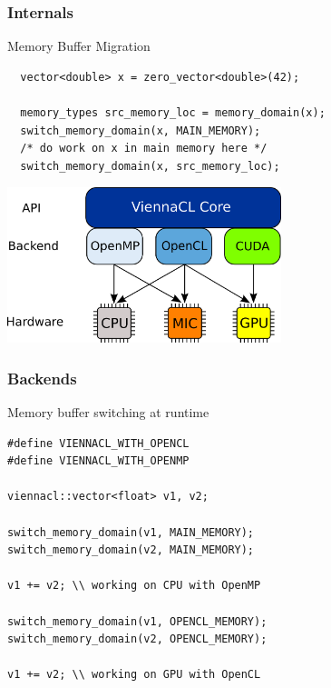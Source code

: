 \begin{frame}[fragile]
\frametitle{Internals}

 \begin{block}{Memory Buffer Migration}
  \begin{lstlisting}
  vector<double> x = zero_vector<double>(42);

  memory_types src_memory_loc = memory_domain(x);
  switch_memory_domain(x, MAIN_MEMORY);
  /* do work on x in main memory here */
  switch_memory_domain(x, src_memory_loc);
\end{lstlisting}

  \begin{center}
    \includegraphics[width=0.6\textwidth]{figs/ViennaCL-arch.png}
  \end{center}
 \end{block}

\end{frame}



\begin{frame}[fragile]
\frametitle{Backends}

\begin{block}{Memory buffer switching at runtime}
\begin{lstlisting}
#define VIENNACL_WITH_OPENCL
#define VIENNACL_WITH_OPENMP

viennacl::vector<float> v1, v2;

switch_memory_domain(v1, MAIN_MEMORY);
switch_memory_domain(v2, MAIN_MEMORY);

v1 += v2; \\ working on CPU with OpenMP

switch_memory_domain(v1, OPENCL_MEMORY);
switch_memory_domain(v2, OPENCL_MEMORY);

v1 += v2; \\ working on GPU with OpenCL
\end{lstlisting}
\end{block}

\end{frame}








